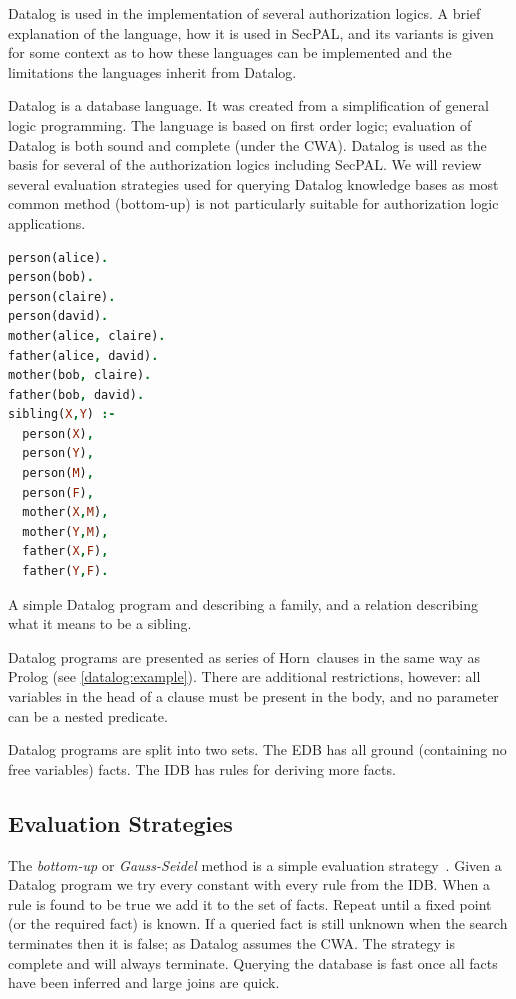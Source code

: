 \documentclass[a4paper,sfsidenotes]{%
  article%
}
\begin{document}
Datalog is used in the implementation of several authorization logics.  A brief
explanation of the language, how it is used in SecPAL, and its variants is given
for some context as to how these languages can be implemented and the
limitations the languages inherit from Datalog.

Datalog is a database language. It was created from a simplification of general
logic programming.  The language is based on first order logic; evaluation of
Datalog is both sound and complete (under the \ac{CWA}).  Datalog is used as the
basis for several of the authorization logics including SecPAL. We will review
several evaluation strategies used for querying Datalog knowledge bases as most
common method (bottom-up) is not particularly suitable for authorization logic
applications.

\begin{marginfigure}
  \label{datalog:example}
  \begin{lstlisting}[language=Prolog]
person(alice).  
person(bob).
person(claire). 
person(david).
mother(alice, claire).
father(alice, david).
mother(bob, claire).
father(bob, david).
sibling(X,Y) :- 
  person(X),
  person(Y),
  person(M),   
  person(F),
  mother(X,M),
  mother(Y,M), 
  father(X,F), 
  father(Y,F).
  \end{lstlisting}
  \caption{A simple Datalog program and describing a family, and a relation
  describing what it means to be a sibling.}
\end{marginfigure}

Datalog programs are presented as series of Horn~clauses in the
same way as Prolog (see \autoref{datalog:example}).  There are
additional restrictions, however: all variables in the head of a clause
must be present in the body, and no parameter can be a nested predicate.

Datalog programs are split into two sets.
The \ac{EDB} has all ground (containing no free variables) facts.
The \ac{IDB} has rules for deriving more facts.

\subsection{Evaluation Strategies}

The \emph{bottom-up} or \emph{Gauss-Seidel} method is a simple evaluation
strategy~\cite{Ceri:1989ff}.  Given a Datalog program we try every constant with
every rule from the \ac{IDB}.  When a rule is found to be true we add it to the set
of facts.  Repeat until a fixed point (or the required fact) is known.  If a
queried fact is still unknown when the search terminates then it is false; as Datalog assumes
the \ac{CWA}.  The strategy is complete and will always
terminate. Querying the database is fast once all facts have been inferred 
and large joins are quick.
\end{document}
